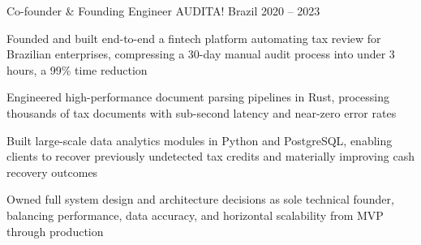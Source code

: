 \begin{cventries}
	\cventry
	{Co-founder \& Founding Engineer}
	{AUDITA!}
	{Brazil}
	{2020 -- 2023}
	{
		\begin{cvitems}
			\item Founded and built end-to-end a fintech platform automating tax review for Brazilian enterprises, compressing a 30-day manual audit process into under 3 hours, a 99\% time reduction
			\item Engineered high-performance document parsing pipelines in Rust, processing thousands of tax documents with sub-second latency and near-zero error rates
			\item Built large-scale data analytics modules in Python and PostgreSQL, enabling clients to recover previously undetected tax credits and materially improving cash recovery outcomes
			\item Owned full system design and architecture decisions as sole technical founder, balancing performance, data accuracy, and horizontal scalability from MVP through production
		\end{cvitems}
	}

\end{cventries}
